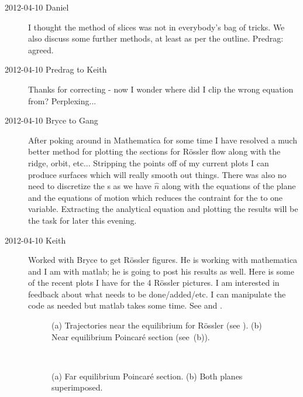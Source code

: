 \begin{description}
\item[2012-04-10 Daniel] I thought the method of slices was not in
everybody's bag of tricks. We also discuss some further methods, at least
as per the outline. Predrag: agreed.

\item[2012-04-10 Predrag to Keith] Thanks for correcting
 - now I wonder where did I clip the wrong equation
from? Perplexing...

\item[2012-04-10 Bryce to Gang] After poking around in Mathematica for
some time I have resolved a much better method for plotting the sections
for R\"ossler flow along with the ridge, orbit, etc... Stripping the
points off of my current plots I can produce surfaces which will really
smooth out things. There was also no need to discretize the {\poincBord
s} as we have $\hat{n}$ along with the equations of the plane and the
equations of motion which reduces the contraint for the {\poincBord} to
one variable. Extracting the analytical equation and plotting the results
will be the task for later this evening.

\item[2012-04-10 Keith] Worked with Bryce to get R\"ossler figures.  He
is working with mathematica and I am with matlab; he is going to post his
results as well.  Here is some of the recent plots I have for the 4
R\"ossler pictures.  I am interested in feedback about what needs to be
done/added/etc.  I can manipulate the code as needed but matlab takes
some time.  See  and .

 \begin{figure}[H]
 \begin{center}
 \end{center}
 \caption{\label{fig:neareq}
(a)
Trajectories near the equilibrium for R\"ossler
(see ).
(b)
Near equilibrium Poincar\'e section
(see \,(b)).
    }
 \end{figure}

 \begin{figure}[H]
 \begin{center}
~~~~~~~~
 \end{center}
 \caption{\label{fig:twoplane}
(a)
Far equilibrium Poincar\'e section.
(b)
Both planes superimposed.
    }
 \end{figure}



\end{description}
